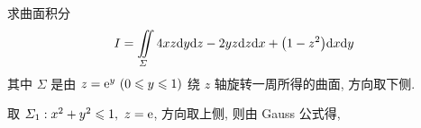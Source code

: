 \begin{example}
    求曲面积分 $$I=\iint\limits_\varSigma 4xz\dd y\dd z-2yz\dd z\dd x+\qty(1-z^2)\dd x\dd y$$
    其中 $\varSigma$ 是由 $z=\mathrm{e} ^y~ (0\leqslant y\leqslant 1)$ 绕 $z$ 轴旋转一周所得的曲面, 方向取下侧.
\end{example}
\begin{solution}
    取 $\varSigma_1:x^2+y^2\leqslant 1,~z=\mathrm{e} $, 方向取上侧, 则由 Gauss 公式得, 
\end{solution}


